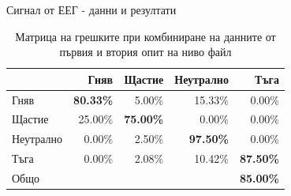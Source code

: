 \documentclass[9pt]{beamer}
\begin{document}
    \begin{frame}[c]{Сигнал от ЕЕГ - данни и резултати}
        \begin{center}
        \begin{table}[h]
            \begin{tabular}{|l|r r r r|} 
                \hline
                & Гняв & Щастие & Неутрално & Тъга \\ 
                \hline
                Гняв &  \textbf{80.33\%} & 5.00\% & 15.33\% & 0.00\% \\ 
                Щастие & 25.00\% & \textbf{75.00\%} & 0.00\% & 0.00\% \\ 
                Неутрално & 0.00\% & 2.50\% & \textbf{97.50\%} & 0.00\% \\ 
                Тъга & 0.00\% & 2.08\% & 10.42\% & \textbf{87.50\%}\\ 
                \hline
                \hline
                Общо & & & & \textbf{85.00\%}\\
                \hline
            \end{tabular}
            \caption*{Матрица на грешките при комбиниране на данните от първия и втория опит на ниво файл}
        \end{table}
    \end{center}
    \end{frame}
\end{document}

